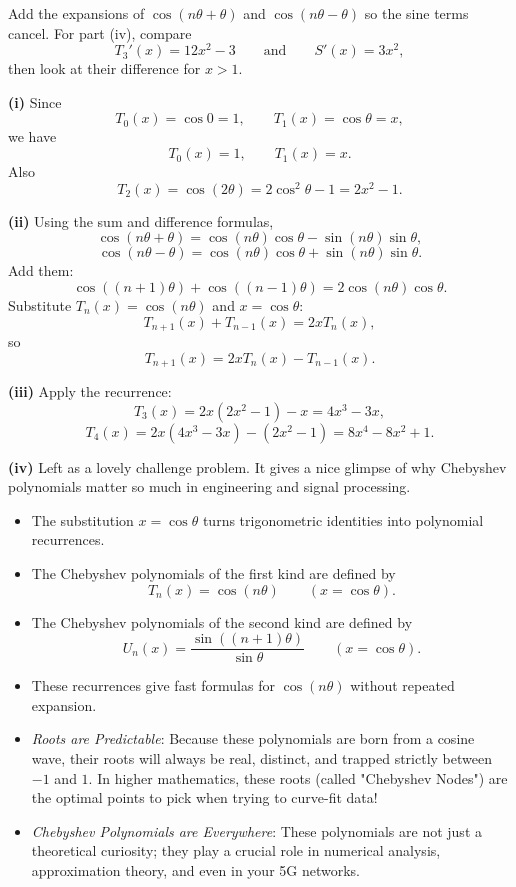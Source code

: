 \begin{hintbox}
Add the expansions of $\cos(n\theta+\theta)$ and $\cos(n\theta-\theta)$ so the sine terms cancel. For part (iv), compare
\[
T_3'(x)=12x^2-3
\qquad\text{and}\qquad
S'(x)=3x^2,
\]
then look at their difference for $x>1$.
\end{hintbox}

\begin{solution}
\textbf{(i)} Since
\[
T_0(x)=\cos 0=1,\qquad T_1(x)=\cos\theta=x,
\]
we have
\[
\boxed{T_0(x)=1,\qquad T_1(x)=x.}
\]
Also
\[
T_2(x)=\cos(2\theta)=2\cos^2\theta-1=2x^2-1.
\]

\textbf{(ii)} Using the sum and difference formulas,
\[
\cos(n\theta+\theta)=\cos(n\theta)\cos\theta-\sin(n\theta)\sin\theta,
\]
\[
\cos(n\theta-\theta)=\cos(n\theta)\cos\theta+\sin(n\theta)\sin\theta.
\]
Add them:
\[
\cos((n+1)\theta)+\cos((n-1)\theta)=2\cos(n\theta)\cos\theta.
\]
Substitute $T_n(x)=\cos(n\theta)$ and $x=\cos\theta$:
\[
T_{n+1}(x)+T_{n-1}(x)=2xT_n(x),
\]
so
\[
\boxed{T_{n+1}(x)=2xT_n(x)-T_{n-1}(x).}
\]

\textbf{(iii)} Apply the recurrence:
\[
T_3(x)=2x(2x^2-1)-x=4x^3-3x,
\]
\[
T_4(x)=2x(4x^3-3x)-(2x^2-1)=8x^4-8x^2+1.
\]

\textbf{(iv)} Left as a lovely challenge problem. It gives a nice glimpse of why Chebyshev polynomials matter so much in engineering and signal processing.
\end{solution}

\begin{takeaways}
\begin{itemize}[leftmargin=*]
\item The substitution $x=\cos\theta$ turns trigonometric identities into polynomial recurrences.
\item The Chebyshev polynomials of the first kind are defined by
\[
T_n(x)=\cos(n\theta)\qquad (x=\cos\theta).
\]
\item The Chebyshev polynomials of the second kind are defined by
\[
U_n(x)=\frac{\sin((n+1)\theta)}{\sin\theta}\qquad (x=\cos\theta).
\]
\item These recurrences give fast formulas for $\cos(n\theta)$ without repeated expansion.
\item \textit{Roots are Predictable}: Because these polynomials are born from a cosine wave, their roots will always be real, distinct, and trapped strictly between $-1$ and $1$. In higher mathematics, these roots (called "Chebyshev Nodes") are the optimal points to pick when trying to curve-fit data!
\item \textit{Chebyshev Polynomials are Everywhere}: These polynomials are not just a theoretical curiosity; they play a crucial role in numerical analysis, approximation theory, and even in your 5G networks. 
\end{itemize}
\end{takeaways}

